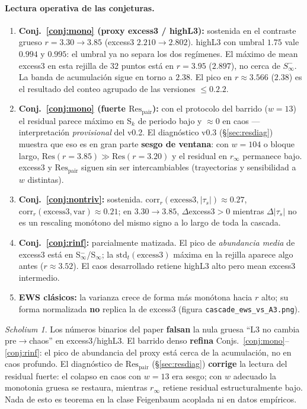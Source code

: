 \documentclass[11pt,a4paper]{article}
\theoremstyle{definition}
\theoremstyle{plain}
\theoremstyle{remark}
\newtheorem{scholium}{Scholium}[section]
\newcommand{\Res}{\mathrm{Res}}
\newcommand{\ts}{\tau_s}
\begin{document}
\paragraph{Lectura operativa de las conjeturas.}
\begin{enumerate}[label=(\roman*)]
  \item \textbf{Conj.~\ref{conj:mono} (proxy excess3 / highL3):}
  sostenida en el contraste grueso $r=3.30\to 3.85$
  (excess3 $2.210\to 2.802$). highL3 con umbral $1.75$ vale $0.994$ y
  $0.995$: el umbral ya no separa los dos reg\'imenes. El m\'aximo de
  mean excess3 en esta rejilla de $32$ puntos est\'a en $r=3.95$
  ($2.897$), no cerca de $S_\infty^-$. La banda de acumulaci\'on sigue
  en torno a $2.38$. El pico en $r\approx 3.566$ ($2.38$) es el resultado
  del conteo agrupado de las versiones $\le 0.2.2$.
  \item \textbf{Conj.~\ref{conj:mono} (fuerte $\Res_{\mathrm{pair}}$):}
  con el protocolo del barrido ($w{=}13$) el residual parece m\'aximo
  en S$_k$ de periodo bajo y $\approx 0$ en caos --- interpretaci\'on
  \emph{provisional} del v0.2. El diagn\'ostico v0.3
  (\S\ref{sec:resdiag}) muestra que eso es en gran parte
  \textbf{sesgo de ventana}: con $w{=}104$ o bloque largo,
  $\Res(r{=}3.85)\gg\Res(r{=}3.20)$ y el residual en $r_\infty$
  permanece bajo. excess3 y $\Res_{\mathrm{pair}}$ siguen sin ser
  intercambiables (trayectorias y sensibilidad a $w$ distintas).
  \item \textbf{Conj.~\ref{conj:nontriv}:} sostenida.
  $\mathrm{corr}_r(\mathrm{excess3},|\ts|)\approx 0.27$,
  $\mathrm{corr}_r(\mathrm{excess3},\mathrm{var})\approx 0.21$;
  en $3.30\to 3.85$, $\Delta$excess3$>0$ mientras $\Delta|\ts|$ no es
  un rescaling mon\'otono del mismo signo a lo largo de toda la cascada.
  \item \textbf{Conj.~\ref{conj:rinf}:} parcialmente matizada.
  El pico de \emph{abundancia media} de excess3 est\'a en
  S$_\infty^-$/S$_\infty$; la $\mathrm{std}_t(\mathrm{excess3})$ m\'axima
  en la rejilla aparece algo antes ($r\approx 3.52$). El caos
  desarrollado retiene highL3 alto pero mean excess3 intermedio.
  \item \textbf{EWS cl\'asicos:} la varianza crece de forma m\'as
  mon\'otona hacia $r$ alto; su forma normalizada \textbf{no} replica la
  de excess3 (figura \texttt{cascade\_ews\_vs\_A3.png}).
\end{enumerate}

\begin{scholium}
Los n\'umeros binarios del paper \textbf{falsan} la nula gruesa ``L3 no
cambia pre$\to$chaos'' en excess3/highL3. El barrido denso \textbf{refina}
Conjs.~\ref{conj:mono}--\ref{conj:rinf}: el pico de abundancia del proxy
est\'a cerca de la acumulaci\'on, no en caos profundo.
El diagn\'ostico de $\Res_{\mathrm{pair}}$ (\S\ref{sec:resdiag})
\textbf{corrige} la lectura del residual fuerte: el colapso en caos
con $w{=}13$ era sesgo; con $w$ adecuado la monotonia gruesa se
restaura, mientras $r_\infty$ retiene residual estructuralmente bajo.
Nada de esto es teorema en la clase Feigenbaum acoplada ni en datos
emp\'iricos.
\end{scholium}
\end{document}

